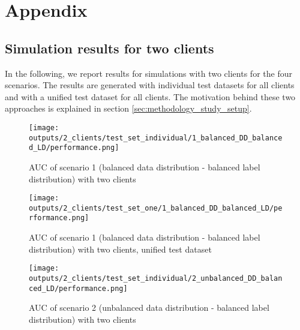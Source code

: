 \section{Appendix\label{sec:appendix}}
\subsection{Simulation results for two clients\label{sec:2_clients}}
In the following, we report results for simulations with two clients for the four scenarios. The results are generated with individual test datasets for all clients and with a unified test dataset for all clients. The motivation behind these two approaches is explained in section \ref{sec:methodology_study_setup}.

\begin{figure}[!h]
    \centering
    \texttt{[image: outputs/2\_clients/test\_set\_individual/1\_balanced\_DD\_balanced\_LD/performance.png]}
    \caption{AUC of scenario 1 (balanced data distribution - balanced label distribution) with two clients}
    \label{fig:auc_box_2_clients_scenario_1}
\end{figure}



\begin{figure}[!h]
    \centering
    \texttt{[image: outputs/2\_clients/test\_set\_one/1\_balanced\_DD\_balanced\_LD/performance.png]}
    \caption{AUC of scenario 1 (balanced data distribution - balanced label distribution) with two clients, unified test dataset}
    \label{fig:auc_box_2_clients_scenario_1_uni}
\end{figure}



\begin{figure}[htb!]
    \centering
    \texttt{[image: outputs/2\_clients/test\_set\_individual/2\_unbalanced\_DD\_balanced\_LD/performance.png]}
    \caption{AUC of scenario 2 (unbalanced data distribution - balanced label distribution) with two clients}
    \label{fig:auc_box_2_clients_scenario_2}
\end{figure}

